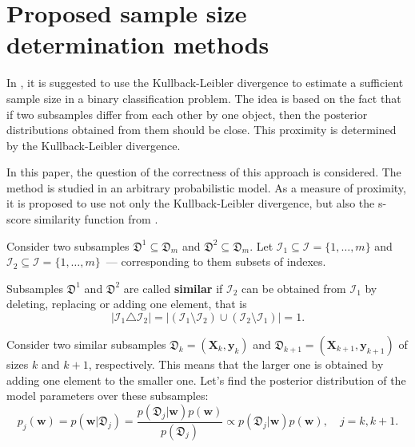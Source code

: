 \documentclass[
11pt,%
tightenlines,%
twoside,%
onecolumn,%
nofloats,%
nobibnotes,%
nofootinbib,%
superscriptaddress,%
noshowpacs,%
centertags]%
{revtex4-2}
\begin{document}
\section{Proposed sample size determination methods}\label{sec2}

In \citep{MOTRENKO2014743}, it is suggested to use the Kullback-Leibler divergence to estimate a sufficient sample size in a binary classification problem. The idea is based on the fact that if two subsamples differ from each other by one object, then the posterior distributions obtained from them should be close. This proximity is determined by the Kullback-Leibler divergence. 

In this paper, the question of the correctness of this approach is considered. The method is studied in an arbitrary probabilistic model. As a measure of proximity, it is proposed to use not only the Kullback-Leibler divergence, but also the s-score similarity function from \citep{Aduenko2017}.

Consider two subsamples $\mathfrak{D}^1\subseteq\mathfrak{D}_m$ and $\mathfrak{D}^2\subseteq\mathfrak{D}_m$. Let $\mathcal{I}_1 \subseteq \mathcal{I} = \{1, \ldots, m\}$ and $\mathcal{I}_2 \subseteq \mathcal{I} =\{1, \ldots,m\}$~--- corresponding to them subsets of indexes.

\begin{definition}
    Subsamples $\mathfrak{D}^1$ and $\mathfrak{D}^2$ are called \textbf{similar} if $\mathcal{I}_2$ can be obtained from $\mathcal{I}_1$ by deleting, replacing or adding one element, that is
    \[ \left| \mathcal{I}_1 \triangle \mathcal{I}_2 \right| = \left| \left( \mathcal{I}_1 \setminus \mathcal{I}_2 \right) \cup \left( \mathcal{I}_2 \setminus \mathcal{I}_1 \right) \right| = 1. \]
\end{definition}

Consider two similar subsamples $\mathfrak{D}_k = (\mathbf{X}_k,\mathbf{y}_k)$ and $\mathfrak{D}_{k+1} = (\mathbf{X}_{k+1}, \mathbf{y}_{k+1})$ of sizes $k$ and $k+1$, respectively. This means that the larger one is obtained by adding one element to the smaller one. Let's find the posterior distribution of the model parameters over these subsamples:
\[p_j(\mathbf{w}) = p(\mathbf{w} | \mathfrak{D}_j) = \dfrac{p(\mathfrak{D}_j | \mathbf{w}) p(\mathbf{w})}{p(\mathfrak{D}_j)} \propto p(\mathfrak{D}_j | \mathbf{w}) p(\mathbf{w}), \quad j = k, k+1. \]
\end{document}
